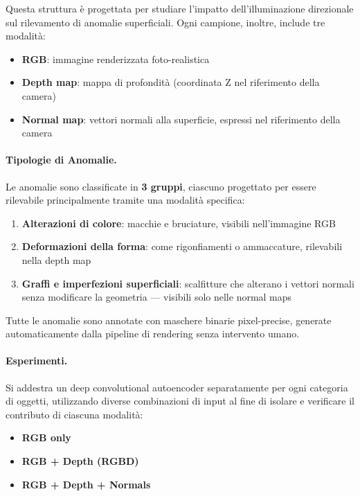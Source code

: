 Questa struttura è progettata per studiare l'impatto dell'illuminazione di\-re\-zio\-na\-le sul rilevamento di anomalie superficiali. Ogni campione, inoltre, include tre modalità:

\begin{itemize}
    \item \textbf{RGB}: immagine renderizzata foto-realistica
    \item \textbf{Depth map}: mappa di profondità (coordinata Z nel riferimento della camera)
    \item \textbf{Normal map}: vettori normali alla superficie, espressi nel riferimento della camera
\end{itemize}

\paragraph{Tipologie di Anomalie.} Le anomalie sono classificate in \textbf{3 gruppi}, ciascuno progettato per essere rilevabile principalmente tramite una modalità specifica:
\begin{enumerate}
    \item \textbf{Alterazioni di colore}: macchie e bruciature, visibili nell'immagine RGB
    \item \textbf{Deformazioni della forma}: come rigonfiamenti o ammaccature, rilevabili nella depth map
    \item \textbf{Graffi e imperfezioni superficiali}: scalfitture che alterano i vettori normali senza modificare la geometria — visibili solo nelle normal maps
\end{enumerate}

Tutte le anomalie sono annotate con maschere binarie pixel-precise, generate automaticamente dalla pipeline di rendering senza intervento umano.

\paragraph{Esperimenti.} Si addestra un deep convolutional autoencoder separatamente per ogni categoria di oggetti, utilizzando diverse combinazioni di input al fine di isolare e verificare il contributo di ciascuna modalità:
\begin{itemize}
    \item \textbf{RGB only}
    \item \textbf{RGB + Depth (RGBD)}
    \item \textbf{RGB + Depth + Normals}
\end{itemize}


